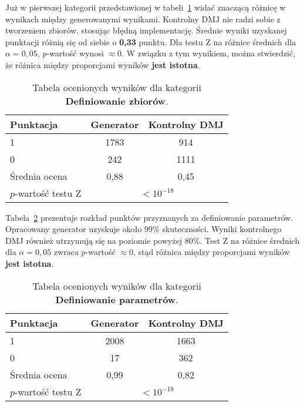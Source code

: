 Już w pierwszej kategorii przedstawionej w tabeli~\ref{tab:tabela17} widać znaczącą różnicę w wynikach między generowanymi wynikami. Kontrolny DMJ nie radzi sobie z tworzeniem zbiorów, stosując błędną implementację. Średnie wyniki uzyskanej punktacji różnią się od siebie o \textbf{0,33} punktu. Dla testu Z na różnice średnich dla $\alpha = 0,05$, %
$p$-wartość wynosi $\approx0$. W związku z tym wynikiem, można stwierdzić, że różnica między proporcjami wyników \textbf{jest istotna}.

\begin{table}[H]
\caption{Tabela ocenionych wyników dla kategorii \textbf{Definiowanie zbiorów}.}\label{tab:tabela17}
\centering%
\begin{tabular}{|l|c|c|}
\hline
\textbf{Punktacja} & \textbf{Generator} & \textbf{Kontrolny DMJ}\\
\hline
1 & 1783 & 914 \\
\hline
0 & 242 & 1111 \\
\hline
Średnia ocena & 0,88 & 0,45 \\
\hline
$p$-wartość testu Z&\multicolumn{2}{c|}{$<10^{-18}$}\\
\hline
\end{tabular}
\end{table}

Tabela~\ref{tab:tabela18} prezentuje rozkład punktów przyznanych za definiowanie parametrów. Opracowany generator uzyskuje około 99\% skuteczności. Wyniki kontrolnego DMJ również utrzymują się na poziomie powyżej 80\%. %
Test Z na różnice średnich dla $\alpha=0,05$ zwraca $p$-wartość $\approx0$, stąd 
różnica między proporcjami wyników \textbf{jest istotna}.

\begin{table}[H]
\caption{Tabela ocenionych wyników dla kategorii \textbf{Definiowanie parametrów}.}\label{tab:tabela18}
\centering%
\begin{tabular}{|l|c|c|}
\hline
\textbf{Punktacja} & \textbf{Generator} & \textbf{Kontrolny DMJ}\\
\hline
1 & 2008 & 1663 \\
\hline
0 & 17 & 362 \\
\hline
Średnia ocena & 0,99 & 0,82 \\
\hline
$p$-wartość testu Z&\multicolumn{2}{c|}{$<10^{-18}$}\\
\hline
\end{tabular}
\end{table}

